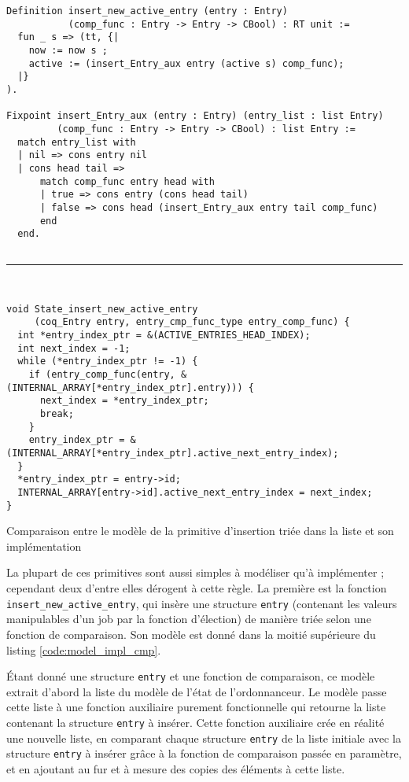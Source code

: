 	\begin{listing}[!ht]
	    \centering
	    \begin{verbatim}
Definition insert_new_active_entry (entry : Entry)
           (comp_func : Entry -> Entry -> CBool) : RT unit :=
  fun _ s => (tt, {|
    now := now s ;
    active := (insert_Entry_aux entry (active s) comp_func);
  |}
).

Fixpoint insert_Entry_aux (entry : Entry) (entry_list : list Entry)
         (comp_func : Entry -> Entry -> CBool) : list Entry :=
  match entry_list with
  | nil => cons entry nil
  | cons head tail =>
      match comp_func entry head with
      | true => cons entry (cons head tail)
      | false => cons head (insert_Entry_aux entry tail comp_func)
      end
  end.


	    \end{verbatim}
	    \hrule
	    \begin{verbatim}


void State_insert_new_active_entry
     (coq_Entry entry, entry_cmp_func_type entry_comp_func) {
  int *entry_index_ptr = &(ACTIVE_ENTRIES_HEAD_INDEX);
  int next_index = -1;
  while (*entry_index_ptr != -1) {
    if (entry_comp_func(entry, &(INTERNAL_ARRAY[*entry_index_ptr].entry))) {
      next_index = *entry_index_ptr;
      break;
    }
    entry_index_ptr = &(INTERNAL_ARRAY[*entry_index_ptr].active_next_entry_index);
  }
  *entry_index_ptr = entry->id;
  INTERNAL_ARRAY[entry->id].active_next_entry_index = next_index;
}
	    \end{verbatim}
	    \caption{Comparaison entre le modèle de la primitive d'insertion triée dans la liste et son implémentation}
	    \label{code:model_impl_cmp}
	\end{listing}

		La plupart de ces primitives sont aussi simples à modéliser qu'à implémenter ; cependant deux d'entre elles dérogent à cette règle. La première est la fonction \texttt{insert\_new\_active\_entry}, qui insère une structure \texttt{entry} (contenant les valeurs manipulables d'un job par la fonction d'élection) de manière triée selon une fonction de comparaison. Son modèle est donné dans la moitié supérieure du listing \ref{code:model_impl_cmp}.

		Étant donné une structure \texttt{entry} et une fonction de comparaison, ce modèle extrait d'abord la liste du modèle de l'état de l'ordonnanceur. Le modèle passe cette liste à une fonction auxiliaire purement fonctionnelle qui retourne la liste contenant la structure \texttt{entry} à insérer. Cette fonction auxiliaire crée en réalité une nouvelle liste, en comparant chaque structure \texttt{entry} de la liste initiale avec la structure \texttt{entry} à insérer grâce à la fonction de comparaison passée en paramètre, et en ajoutant au fur et à mesure des copies des éléments à cette liste.

